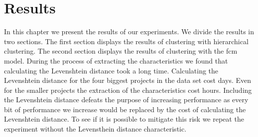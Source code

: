 \documentclass[../main]{subfiles}
\begin{document}
\chapter{Results}
\label{ch:results}
In this chapter we present the results of our experiments.
We divide the results in two sections. 
The first section displays the results of clustering with hierarchical clustering.
The second section displays the results of clustering with the \acrshort{fcm} model.
\newline
During the process of extracting the characteristics we found that calculating the Levenshtein distance took a long time.
Calculating the Levenshtein distance for the four biggest projects in the data set cost days.
Even for the smaller projects the extraction of the characteristics cost hours.
Including the Levenshtein distance defeats the purpose of increasing performance as every bit of performance we increase would be replaced by the cost of calculating the Levenshtein distance.
To see if it is possible to mitigate this risk we repeat the experiment without the Levensthein distance characteristic.




\end{document}
